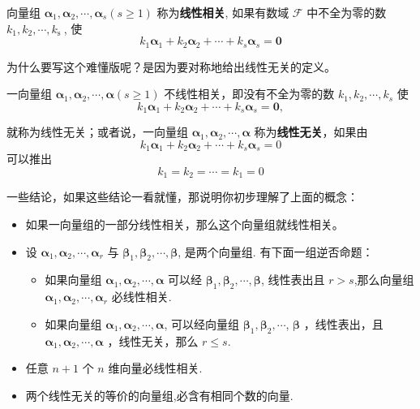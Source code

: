 \begin{definition}[线性相关难懂版]
    向量组 $\boldsymbol{\alpha}_1, \boldsymbol{\alpha}_2, \cdots, \boldsymbol{\alpha}_s(s \geqslant 1)$ 称为\textcolor{third}{\bf 线性相关}, 如果有数域 $\mathcal{F}$ 中不全为零的数 $k_1, k_2, \cdots, k_{\text {s }}$, 使
$$
k_1 \boldsymbol{\alpha}_1+k_2 \boldsymbol{\alpha}_2+\cdots+k_s \boldsymbol{\alpha}_s=\mathbf{0}
$$
\end{definition}

为什么要写这个难懂版呢？是因为要对称地给出线性无关的定义。

\begin{definition}[向量组线性无关]
    一向量组 $\boldsymbol{\alpha}_1, \boldsymbol{\alpha}_2, \cdots, \boldsymbol{\alpha}(s \geqslant 1)$ 不线性相关，即没有不全为零的数 $k_1, k_2, \cdots, k_s$ 使
$$
k_1 \boldsymbol{\alpha}_1+k_2 \boldsymbol{\alpha}_2+\cdots+k_s \boldsymbol{\alpha}_s=\mathbf{0},
$$

就称为线性无关；或者说，一向量组 $\boldsymbol{\alpha}_1, \boldsymbol{\alpha}_2, \cdots, \boldsymbol{\alpha}$ 称为\textcolor{third}{\bf 线性无关}，如果由
$$
k_1 \boldsymbol{\alpha}_1+k_2 \boldsymbol{\alpha}_2+\cdots+k_s \boldsymbol{\alpha}_s=0
$$
可以推出
$$
k_1=k_2=\cdots=k_1=0
$$
\end{definition}


一些结论，如果这些结论一看就懂，那说明你初步理解了上面的概念：

\begin{itemize}
    \item 如果一向量组的一部分线性相关，那么这个向量组就线性相关。
    \item 设 $\boldsymbol{\alpha}_1, \boldsymbol{\alpha}_2, \cdots, \boldsymbol{\alpha}_r$ 与 $\boldsymbol{\beta}_1, \boldsymbol{\beta}_2, \cdots, \boldsymbol{\beta}$, 是两个向量组. 有下面一组逆否命题：
    \begin{itemize}
        \item  如果向量组 $\boldsymbol{\alpha}_1, \boldsymbol{\alpha}_2, \cdots, \boldsymbol{\alpha}$ 可以经 $\boldsymbol{\beta}_1, \boldsymbol{\beta}_2, \cdots, \boldsymbol{\beta}$, 线性表出且 $r>s$,那么向量组 $\boldsymbol{\alpha}_1, \boldsymbol{\alpha}_2, \cdots, \boldsymbol{\alpha}_r$ 必线性相关.

        \item 如果向量组 $\boldsymbol{\alpha}_1, \boldsymbol{\alpha}_2, \cdots, \boldsymbol{\alpha}$, 可以经向量组 $\boldsymbol{\beta}_1, \boldsymbol{\beta}_2, \cdots$, $\boldsymbol{\beta}$ ，线性表出，且 $\boldsymbol{\alpha}_1, \boldsymbol{\alpha}_2, \cdots, \boldsymbol{\alpha}$ ，线性无关，那么 $r \leqslant s$.
    \end{itemize}
    \item 任意 $n+1$ 个 $n$ 维向量必线性相关.
    \item 两个线性无关的等价的向量组,必含有相同个数的向量.
\end{itemize}

